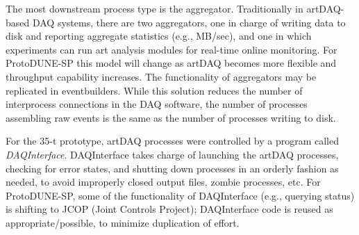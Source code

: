 The most downstream process type is the aggregator. Traditionally in
artDAQ-based DAQ systems, there are two aggregators, one in charge of
writing data to disk and reporting aggregate statistics (e.g., MB/sec), and one in which 
experiments can run art analysis modules for
real-time online monitoring. 
%
%
For ProtoDUNE-SP this model will change as
artDAQ becomes more flexible and throughput
capability increases. The functionality
of aggregators may be replicated in eventbuilders. While this solution  reduces
the number of interprocess connections in the DAQ software, the number of
processes assembling raw events is the same as the number of processes
writing to disk.


 
For the 35-t prototype, artDAQ processes were controlled by a program called
\textit{DAQInterface}. DAQInterface takes 
charge of launching the artDAQ processes, checking for error states, and
shutting down
 processes in an orderly fashion as needed, to avoid improperly closed output files,
zombie processes, etc. For ProtoDUNE-SP, some of the functionality of DAQInterface (e.g., querying  status) is shifting to JCOP (Joint Controls Project);
DAQInterface code is reused as appropriate/possible, to minimize duplication of effort. 



